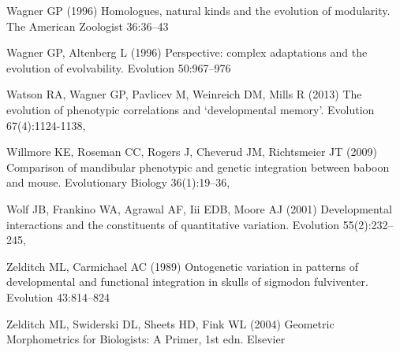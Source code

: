 \documentclass [twocolumn, natbib, nospthms, 10pt] {svjour3}
\begin{document}
\begin{thebibliography}{77}
Wagner GP (1996) Homologues, natural kinds and the evolution of modularity. The
  American Zoologist 36:36--43

Wagner GP, Altenberg L (1996) Perspective: complex adaptations and the
  evolution of evolvability. Evolution 50:967–976

Watson RA, Wagner GP, Pavlicev M, Weinreich DM, Mills R (2013) The evolution of
  phenotypic correlations and ‘developmental memory’. Evolution 67(4):1124-1138,

Willmore KE, Roseman CC, Rogers J, Cheverud JM, Richtsmeier JT (2009)
  Comparison of mandibular phenotypic and genetic integration between baboon
  and mouse. Evolutionary Biology 36(1):19–36,

Wolf JB, Frankino WA, Agrawal AF, Iii EDB, Moore AJ (2001) Developmental
  interactions and the constituents of quantitative variation. Evolution
  55(2):232–245, 

Zelditch ML, Carmichael AC (1989) Ontogenetic variation in patterns of
  developmental and functional integration in skulls of sigmodon fulviventer.
  Evolution 43:814–824

Zelditch ML, Swiderski DL, Sheets HD, Fink WL (2004) Geometric Morphometrics
  for Biologists: A Primer, 1st edn. Elsevier

\end{thebibliography}

\end{document}
